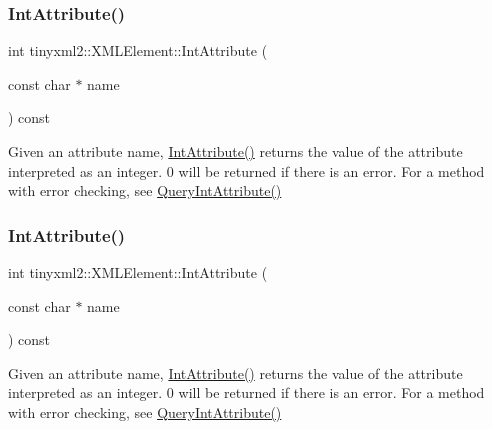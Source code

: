 \subsubsection{\texorpdfstring{Int\+Attribute()}{IntAttribute()}\hspace{0.1cm}{\footnotesize\ttfamily [1/2]}}
{\footnotesize\ttfamily int tinyxml2\+::\+X\+M\+L\+Element\+::\+Int\+Attribute (\begin{DoxyParamCaption}\item[{const char $\ast$}]{name }\end{DoxyParamCaption}) const\hspace{0.3cm}{\ttfamily [inline]}}

Given an attribute name, \hyperlink{classtinyxml2_1_1XMLElement_acfaaeeadf0b0dbe56bb0f5ec12cb7736}{Int\+Attribute()} returns the value of the attribute interpreted as an integer. 0 will be returned if there is an error. For a method with error checking, see \hyperlink{classtinyxml2_1_1XMLElement_a8a78bc1187c1c45ad89f2690eab567b1}{Query\+Int\+Attribute()} \mbox{\label{classtinyxml2_1_1XMLElement_acfaaeeadf0b0dbe56bb0f5ec12cb7736}} 
\subsubsection{\texorpdfstring{Int\+Attribute()}{IntAttribute()}\hspace{0.1cm}{\footnotesize\ttfamily [2/2]}}
{\footnotesize\ttfamily int tinyxml2\+::\+X\+M\+L\+Element\+::\+Int\+Attribute (\begin{DoxyParamCaption}\item[{const char $\ast$}]{name }\end{DoxyParamCaption}) const\hspace{0.3cm}{\ttfamily [inline]}}

Given an attribute name, \hyperlink{classtinyxml2_1_1XMLElement_acfaaeeadf0b0dbe56bb0f5ec12cb7736}{Int\+Attribute()} returns the value of the attribute interpreted as an integer. 0 will be returned if there is an error. For a method with error checking, see \hyperlink{classtinyxml2_1_1XMLElement_a8a78bc1187c1c45ad89f2690eab567b1}{Query\+Int\+Attribute()} \mbox{\label{classtinyxml2_1_1XMLElement_a8a78bc1187c1c45ad89f2690eab567b1}} 
